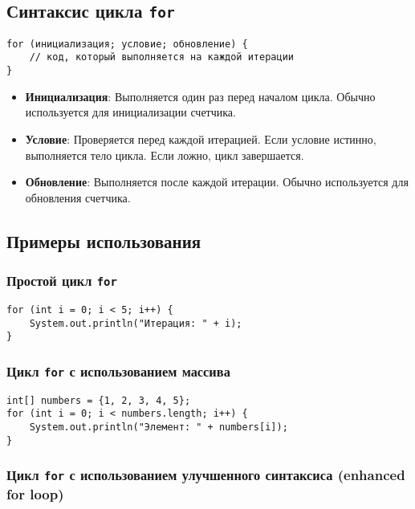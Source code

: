\documentclass[12pt, a4paper]{article}
\begin{document}
\subsection*{Синтаксис цикла \texttt{for}}

\begin{verbatim}
for (инициализация; условие; обновление) {
    // код, который выполняется на каждой итерации
}
\end{verbatim}

\begin{itemize}
    \item \textbf{Инициализация}: Выполняется один раз перед началом цикла. Обычно используется для инициализации счетчика.
    \item \textbf{Условие}: Проверяется перед каждой итерацией. Если условие истинно, выполняется тело цикла. Если ложно, цикл завершается.
    \item \textbf{Обновление}: Выполняется после каждой итерации. Обычно используется для обновления счетчика.
\end{itemize}

\subsection*{Примеры использования}

\subsubsection*{Простой цикл \texttt{for}}

\begin{verbatim}
for (int i = 0; i < 5; i++) {
    System.out.println("Итерация: " + i);
}
\end{verbatim}

\subsubsection*{Цикл \texttt{for} с использованием массива}

\begin{verbatim}
int[] numbers = {1, 2, 3, 4, 5};
for (int i = 0; i < numbers.length; i++) {
    System.out.println("Элемент: " + numbers[i]);
}
\end{verbatim}

\subsubsection*{Цикл \texttt{for} с использованием улучшенного синтаксиса (enhanced for loop)}
\end{document}
